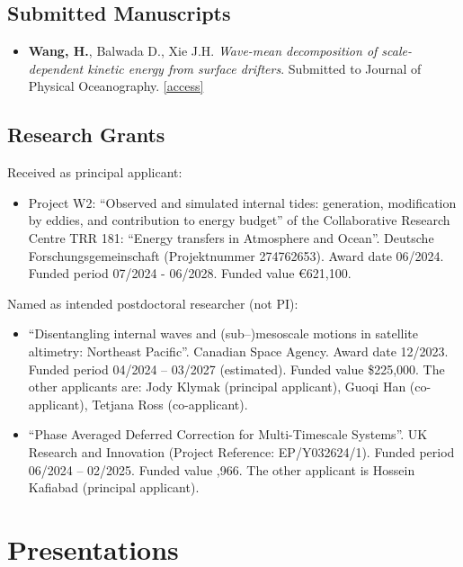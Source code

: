 \documentclass[a4paper,12pt]{article}
\begin{document}
\subsection{Submitted Manuscripts}
\begin{itemize}
\item \textbf{Wang, H.}, Balwada D., Xie J.H. \textit{Wave-mean decomposition of scale-dependent kinetic energy from surface drifters}. Submitted to Journal of Physical Oceanography. \href{https://arxiv.org/abs/2606.03744}{[access]}
\end{itemize}

\subsection{Research Grants}
Received as principal applicant:
\begin{itemize}[leftmargin=*,noitemsep]
\item Project W2: ``Observed and simulated internal tides: generation, modification by eddies, and contribution to energy budget'' of the Collaborative Research Centre TRR 181:  ``Energy transfers in Atmosphere and Ocean''. Deutsche Forschungsgemeinschaft (Projektnummer 274762653).  Award date  06/2024. Funded period 07/2024 - 06/2028. Funded value \euro 621,100. 
\end{itemize}
Named as intended postdoctoral researcher (not PI):
\begin{itemize}[leftmargin=*,noitemsep]
\item ``Disentangling internal waves and (sub–)mesoscale motions in satellite altimetry: Northeast Pacific”. Canadian Space Agency.  Award date 12/2023.  Funded period 04/2024 – 03/2027 (estimated). Funded value \$225,000. The other applicants are: Jody Klymak (principal applicant), Guoqi Han (co-applicant), Tetjana Ross (co-applicant). 
\item``Phase Averaged Deferred Correction for Multi-Timescale Systems”. UK Research and Innovation (Project Reference: EP/Y032624/1). Funded period 06/2024 – 02/2025. Funded value ,966. The other applicant is Hossein Kafiabad (principal applicant). 
\end{itemize}

\section{Presentations}
\end{document}
